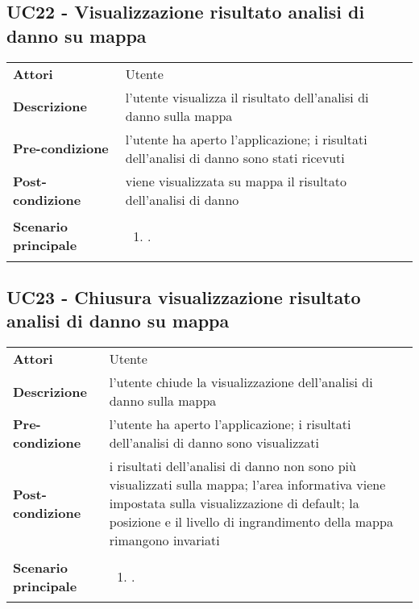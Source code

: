 \subsection{UC22 - Visualizzazione risultato analisi di danno su mappa} 
\label{sssec:UC22} 
\def\arraystretch{1.5}
\begin{tabularx}{\textwidth}{l|p{}}
	\rowcolor{I} \multicolumn{2}{c}{\color{white}\textbf{UC22 - Visualizzazione risultato analisi di danno su mappa}} \\
	\toprule
	\endhead
	\textbf{Attori} & Utente\\
	\textbf{Descrizione} & l'utente visualizza il risultato dell'analisi di danno sulla mappa\\
	\textbf{Pre-condizione} & l'utente ha aperto l'applicazione; i risultati dell'analisi di danno sono stati ricevuti\\
	\textbf{Post-condizione} & viene visualizzata su mappa il risultato dell'analisi di danno\\
	\textbf{Scenario principale} & \vspace{-1.2em}\begin{enumerate}[leftmargin=*,noitemsep,nosep]
		\item \nameref{sssec:UC22}.
	\end{enumerate}\\
	\bottomrule
\end{tabularx}
\subsection{UC23 - Chiusura visualizzazione risultato analisi di danno su mappa} 
\label{sssec:UC23} 
\def\arraystretch{1.5}
\begin{tabularx}{\textwidth}{l|p{}}
	\rowcolor{I} \multicolumn{2}{c}{\color{white}\textbf{UC23 - Chiusura visualizzazione risultato analisi di danno su mappa}} \\
	\toprule
	\endhead
	\textbf{Attori} & Utente\\
	\textbf{Descrizione} & l'utente chiude la visualizzazione dell'analisi di danno sulla mappa\\
	\textbf{Pre-condizione} & l'utente ha aperto l'applicazione; i risultati dell'analisi di danno sono visualizzati\\
	\textbf{Post-condizione} & i risultati dell'analisi di danno non sono più visualizzati sulla mappa;  l'area informativa viene impostata sulla visualizzazione di default; la posizione e il livello di ingrandimento della mappa rimangono invariati\\
	\textbf{Scenario principale} & \vspace{-1.2em}\begin{enumerate}[leftmargin=*,noitemsep,nosep]
		\item \nameref{sssec:UC23}.
	\end{enumerate}\\
	\bottomrule
\end{tabularx}
